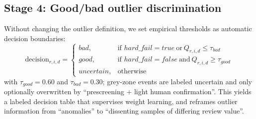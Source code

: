 \documentclass[sn-mathphys-num]{sn-jnl}
\begin{document}
\subsection{Stage 4: Good/bad outlier discrimination}
Without changing the outlier definition, we set empirical thresholds as automatic decision boundaries:
\begin{equation}
\mathrm{decision}_{r,i,d} =
\begin{cases}
\mathit{bad}, & \text{if } \mathit{hard\_fail} = \mathit{true}\ \text{or}\ Q_{r,i,d} \le \tau_{bad} \\
\mathit{good}, & \text{if } \mathit{hard\_fail} = \mathit{false}\ \text{and}\ Q_{r,i,d} \ge \tau_{good} \\
\mathit{uncertain}, & \text{otherwise}
\end{cases}
\label{eq:decision}
\end{equation}
with $\tau_{good}=0.60$ and $\tau_{bad}=0.30$; grey-zone events are labeled uncertain and only optionally overwritten by ``prescreening + light human confirmation''. This yields a labeled decision table that supervises weight learning, and reframes outlier information from ``anomalies'' to ``dissenting samples of differing review value''.
\end{document}

